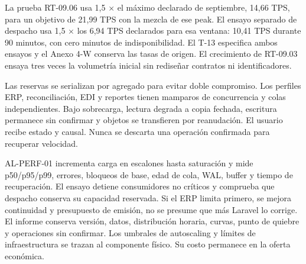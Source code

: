 La prueba RT-09.06 usa 1,5 $\times$ el máximo declarado de septiembre, 14,66 TPS, para un objetivo de 21,99 TPS con la mezcla de ese peak. El ensayo separado de despacho usa 1,5 $\times$ los 6,94 TPS declarados para esa ventana: 10,41 TPS durante 90 minutos, con cero minutos de indisponibilidad. El T-13 especifica ambos ensayos y el Anexo 4-W conserva las tasas de origen. El crecimiento de RT-09.03 ensaya tres veces la volumetría inicial sin rediseñar contratos ni identificadores.

Las reservas se serializan por agregado para evitar doble compromiso. Los perfiles ERP, reconciliación, EDI y reportes tienen mamparos de concurrencia y colas independientes. Bajo sobrecarga, lectura degrada a copia fechada, escritura permanece sin confirmar y objetos se transfieren por reanudación. El usuario recibe estado y causal. Nunca se descarta una operación confirmada para recuperar velocidad.

AL-PERF-01 incrementa carga en escalones hasta saturación y mide p50/p95/p99, errores, bloqueos de base, edad de cola, WAL, buffer y tiempo de recuperación. El ensayo detiene consumidores no críticos y comprueba que despacho conserva su capacidad reservada. Si el ERP limita primero, se mejora continuidad y presupuesto de emisión, no se presume que más Laravel lo corrige. El informe conserva versión, datos, distribución horaria, curvas, punto de quiebre y operaciones sin confirmar. Los umbrales de autoscaling y límites de infraestructura se trazan al componente físico. Su costo permanece en la oferta económica.

\label{fuente-23-anexo-4-1-t-desempeno-fin}
